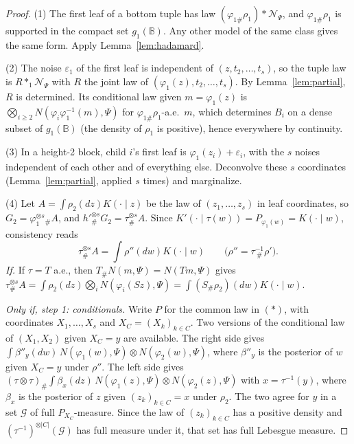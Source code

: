 \documentclass[11pt]{article}
\theoremstyle{definition}
\begin{document}
\begin{proof}
(1) The first leaf of a bottom tuple has law $(\varphi_{1\#}\rho_1)*\mathcal N_\Psi$, and
$\varphi_{1\#}\rho_1$ is supported in the compact set $g_1(\mathbb B)$. Any other model of the same class
gives the same form. Apply Lemma~\ref{lem:hadamard}.

(2) The noise $\varepsilon_1$ of the first leaf is independent of $(z,t_2,\dots,t_s)$, so the tuple law
is $R*_1\mathcal N_\Psi$ with $R$ the joint law of $(\varphi_1(z),t_2,\dots,t_s)$. By
Lemma~\ref{lem:partial}, $R$ is determined. Its conditional law given $m=\varphi_1(z)$ is
$\bigotimes_{i\ge2}N(\varphi_i\varphi_1^{-1}(m),\Psi)$ for $\varphi_{1\#}\rho_1$-a.e.\ $m$, which
determines $B_i$ on a dense subset of $g_1(\mathbb B)$ (the density of $\rho_1$ is positive), hence
everywhere by continuity.

(3) In a height-2 block, child $i$'s first leaf is $\varphi_1(z_i)+\varepsilon_i$, with the $s$ noises
independent of each other and of everything else. Deconvolve these $s$ coordinates
(Lemma~\ref{lem:partial}, applied $s$ times) and marginalize.

(4) Let $A=\int\rho_2(dz)K(\cdot\mid z)$ be the law of $(z_1,\dots,z_s)$ in leaf coordinates, so
$G_2=\varphi_1^{\otimes s}{}_{\#}A$, and $h'^{\otimes s}_{\#}G_2=\tau^{\otimes s}_{\#}A$. Since
$K'(\cdot\mid\tau(w))=P_{\varphi_1(w)}=K(\cdot\mid w)$, consistency reads
\[
\tau^{\otimes s}_{\#}A=\int\rho''(dw)K(\cdot\mid w)\qquad\big(\rho''=\tau^{-1}_{\ \#}\rho'\big).\tag{$\ast$}
\]
\emph{If.} If $\tau=T$ a.e., then $T_\#N(m,\Psi)=N(Tm,\Psi)$ gives
$\tau^{\otimes s}_{\#}A=\int\rho_2(dz)\bigotimes_iN(\varphi_i(Sz),\Psi)=\int(S_\#\rho_2)(dw)K(\cdot\mid w)$.

\emph{Only if, step 1: conditionals.} Write $P$ for the common law in $(\ast)$, with coordinates
$X_1,\dots,X_s$ and $X_C=(X_k)_{k\in C}$. Two versions of the conditional law of $(X_1,X_2)$ given
$X_C=y$ are available. The right side gives
$\int\beta''_y(dw)\,N(\varphi_1(w),\Psi)\otimes N(\varphi_2(w),\Psi)$, where $\beta''_y$ is the posterior
of $w$ given $X_C=y$ under $\rho''$. The left side gives
$(\tau\otimes\tau)_\#\int\beta_x(dz)\,N(\varphi_1(z),\Psi)\otimes N(\varphi_2(z),\Psi)$ with
$x=\tau^{-1}(y)$, where $\beta_x$ is the posterior of $z$ given $(z_k)_{k\in C}=x$ under $\rho_2$. The
two agree for $y$ in a set $\mathcal G$ of full $P_{X_C}$-measure. Since the law of $(z_k)_{k\in C}$ has
a positive density and $(\tau^{-1})^{\otimes|C|}(\mathcal G)$ has full measure under it, that set has full
Lebesgue measure.


\end{proof}
\end{document}
